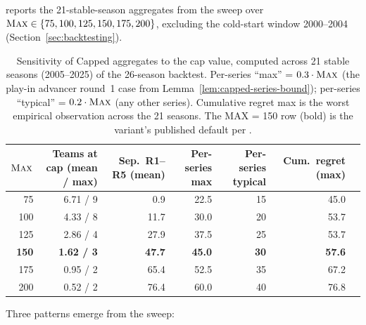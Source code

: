  reports the 21-stable-season aggregates from the sweep over $\textup{\textsc{Max}} \in \{75, 100, 125, 150, 175, 200\}$, excluding the cold-start window 2000--2004 (Section~\ref{sec:backtesting}).

\begin{table}[t]
\centering
\footnotesize
\begin{tabular}{rrrrrrr}
\toprule
$\textup{\textsc{Max}}$ & Teams at cap (mean / max) & Sep.\ R1--R5 (mean) & Per-series max & Per-series typical & Cum.\ regret (max) \\
\midrule
75  & 6.71 / 9 &  0.9 & 22.5 & 15 & 45.0 \\
100 & 4.33 / 8 & 11.7 & 30.0 & 20 & 53.7 \\
125 & 2.86 / 4 & 27.9 & 37.5 & 25 & 53.7 \\
\textbf{150} & \textbf{1.62 / 3} & \textbf{47.7} & \textbf{45.0} & \textbf{30} & \textbf{57.6} \\
175 & 0.95 / 2 & 65.4 & 52.5 & 35 & 67.2 \\
200 & 0.52 / 2 & 76.4 & 60.0 & 40 & 76.8 \\
\bottomrule
\end{tabular}
\caption{Sensitivity of Capped \cola{} aggregates to the cap value, computed across 21 stable seasons (2005--2025) of the 26-season backtest. Per-series ``max'' = $0.3 \cdot \textup{\textsc{Max}}$ (the play-in advancer round~1 case from Lemma~\ref{lem:capped-series-bound}); per-series ``typical'' = $0.2 \cdot \textup{\textsc{Max}}$ (any other series). Cumulative regret max is the worst empirical observation across the 21 seasons. The MAX = 150 row (bold) is the variant's published default per \citet{highley2026solvable5}.}
\label{tab:cap-sweep}
\end{table}

Three patterns emerge from the sweep:

